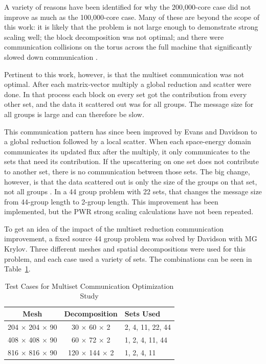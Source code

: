 A variety of reasons have been identified for why the 200,000-core case did not improve as much as the 100,000-core case. Many of these are beyond the scope of this work: it is likely that the problem is not large enough to demonstrate strong scaling well; the block decomposition was not optimal; and there were communication collisions on the torus across the full machine that significantly slowed down communication \cite{Davidson2010}. 

Pertinent to this work, however, is that the multiset communication was not optimal. After each matrix-vector multiply a global reduction and scatter were done. In that process each block on every set got the contribution from every other set, and the data it scattered out was for all groups. The message size for all groups is large and can therefore be slow.

This communication pattern has since been improved by Evans and Davidson to a global reduction followed by a local scatter. When each space-energy domain communicates its updated flux after the multiply, it only communicates to the sets that need its contribution. If the upscattering on one set does not contribute to another set, there is no communication between those sets. The big change, however, is that the data scattered out is only the size of the groups on that set, not all groups \cite{Evans2011b}. In a 44 group problem with 22 sets, that changes the message size from 44-group length to 2-group length. This improvement has been implemented, but the PWR strong scaling calculations have not been repeated. 

To get an idea of the impact of the multiset reduction communication improvement, a fixed source 44 group problem was solved by Davidson with MG Krylov. Three different meshes and spatial decompositions were used for this problem, and each case used a variety of sets. The combinations can be seen in Table~\ref{table:MultisetCommOpt}.
%
\begin{table}[!h]
\caption{Test Cases for Multiset Communication Optimization Study}
\begin{center}
\begin{tabular}{c c l}
\hline
Mesh & Decomposition & Sets Used \\[0.5ex]
\hline
204 $\times$ 204 $\times$ 90 & 30 $\times$  60 $\times$  2 & 2, 4, 11, 22, 44 \\
408 $\times$ 408 $\times$ 90 & 60 $\times$  72 $\times$  2 & 1, 2, 4, 11, 44 \\
816 $\times$ 816 $\times$ 90 & 120 $\times$  144 $\times$  2 & 1, 2, 4, 11 \\
\hline
\end{tabular}
\end{center}
\label{table:MultisetCommOpt}
\end{table}

